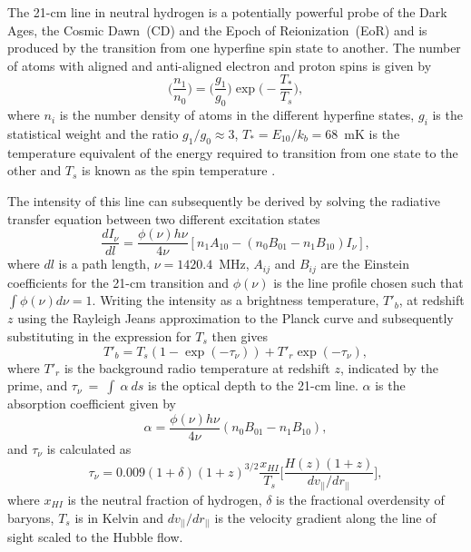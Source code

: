 The 21-cm line in neutral hydrogen is a potentially powerful probe of the Dark Ages, the Cosmic Dawn~(CD) and the Epoch of Reionization~(EoR) and is produced by the transition from one hyperfine spin state to another. The number of atoms with aligned and anti-aligned electron and proton spins is given by
\begin{equation}
    \bigg(\frac{n_1}{n_0}\bigg) = \bigg(\frac{g_1}{g_0}\bigg) \exp\bigg(-\frac{T_*}{T_s}\bigg),
\end{equation}
where $n_i$ is the number density of atoms in the different hyperfine states, $g_i$ is the statistical weight and the ratio $g_1/g_0\approx3$, $T_* = E_{10}/k_b = 68$~mK is the temperature equivalent of the energy required to transition from one state to the other and $T_s$ is known as the spin temperature \cite{Madau1997, Shaver1999, Furlanetto_review_2006, Pritchard2012, Barkana_review_2016, Mesinger2019}.

The intensity of this line can subsequently be derived by solving the radiative transfer equation between two different excitation states
\begin{equation}
    \frac{d I_\nu}{d l} = \frac{\phi(\nu) h \nu}{4\nu} [n_1 A_{10} - (n_0 B_{01} - n_1 B_{10})I_\nu],
\end{equation}
where $dl$ is a path length, $\nu = 1420.4$~MHz, $A_{ij}$ and $B_{ij}$ are the Einstein coefficients for the 21-cm transition and $\phi(\nu)$ is the line profile chosen such that $\int \phi(\nu) d\nu = 1$. Writing the intensity as a brightness temperature, $T'_b$, at redshift $z$ using the Rayleigh Jeans approximation to the Planck curve and subsequently substituting in the expression for $T_s$ then gives
\begin{equation}
    T'_b = T_s (1-\exp(-\tau_{\nu})) + T'_r \exp(-\tau_{\nu}),
    \label{eq:bright_temp}
\end{equation}
where $T'_r$ is the background radio temperature at redshift $z$, indicated by the prime, and $\tau_{\nu}~=~\int~\alpha~ds$ is the optical depth to the 21-cm line. $\alpha$ is the absorption coefficient given by
\begin{equation}
    \alpha = \frac{\phi(\nu) h \nu}{4\nu} (n_0 B_{01} - n_1 B_{10}),
\end{equation}
and $\tau_{\nu}$ is calculated as
\begin{equation}
    \tau_{\nu} = 0.009 (1 + \delta) (1 + z)^{3/2} \frac{x_{HI}}{T_s}\bigg[\frac{H(z) (1+z)}{dv_{||}/dr_{||}}\bigg],
    \label{eq:optical_depth}
\end{equation}
where $x_{HI}$ is the neutral fraction of hydrogen, $\delta$ is the fractional overdensity of baryons, $T_s$ is in Kelvin and $dv_{||}/dr_{||}$ is the velocity gradient along the line of sight scaled to the Hubble flow.

